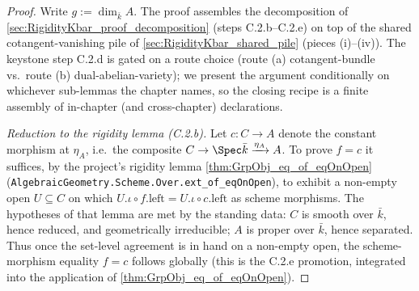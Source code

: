 \begin{proof}
  Write \(g := \dim_{\bar k} A\). The proof assembles the decomposition of
  \cref{sec:RigidityKbar_proof_decomposition} (steps C.2.b–C.2.e) on top of
  the shared cotangent-vanishing pile of \cref{sec:RigidityKbar_shared_pile}
  (pieces (i)–(iv)). The keystone step C.2.d is gated on a route choice (route
  (a) cotangent-bundle vs.\ route (b) dual-abelian-variety); we present the
  argument conditionally on whichever sub-lemmas the chapter names, so the
  closing recipe is a finite assembly of in-chapter (and cross-chapter)
  declarations.

  \emph{Reduction to the rigidity lemma (C.2.b).} Let
  \(c \colon C \to A\) denote the constant morphism at \(\eta_A\), i.e.\ the
  composite \(C \to \Spec \bar k \xrightarrow{\eta_A} A\). To prove \(f = c\)
  it suffices, by the project's rigidity lemma
  \cref{thm:GrpObj_eq_of_eqOnOpen} (\texttt{AlgebraicGeometry.Scheme.Over.ext\_of\_eqOnOpen}),
  to exhibit a non-empty open \(U \subseteq C\) on which
  \(U.\iota \circ f.\mathrm{left} = U.\iota \circ c.\mathrm{left}\) as scheme
  morphisms. The hypotheses of that lemma are met by the standing data:
  \(C\) is smooth over \(\bar k\), hence reduced, and geometrically
  irreducible; \(A\) is proper over \(\bar k\), hence separated. Thus once the
  set-level agreement is in hand on a non-empty open, the scheme-morphism
  equality \(f = c\) follows globally (this is the C.2.e promotion, integrated
  into the application of \cref{thm:GrpObj_eq_of_eqOnOpen}).


\end{proof}
